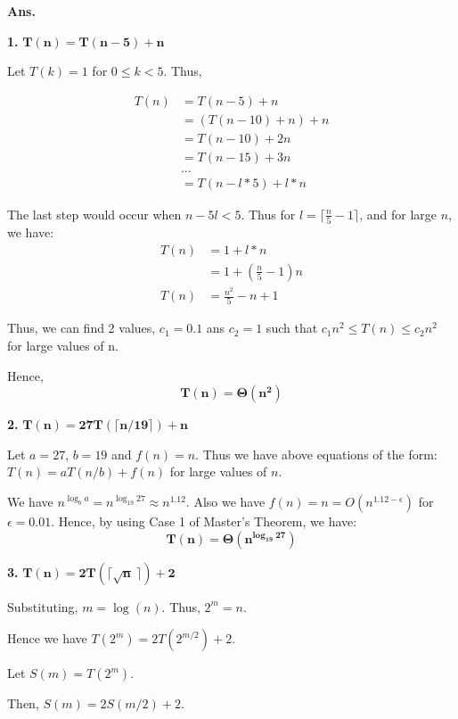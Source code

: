 \documentclass[11pt]{article}
\begin{document}
\noindent \textbf{Ans.}

\textbf{1.} $\mathbf{T(n) = T(n-5) + n}$

Let $T(k) = 1$ for $0 \leq k<5$. Thus,

\begin{equation}
    \begin{split}
        T(n) & = T(n-5) + n\\
        & = (T(n-10)+n)+n\\
        & = T(n-10)+2n\\
        & = T(n-15)+3n\\
        & ...\\
        & = T(n-l*5) + l*n
    \end{split}
\end{equation}

The last step would occur when $n-5l<5$. Thus for $l=\lceil \frac{n}{5} -1 \rceil$, and for large $n$, we have:
\begin{equation}
    \begin{split}
        T(n) & = 1+l*n\\
        &=1+(\frac{n}{5} -1)n\\
        T(n) &= \frac{n^2}{5}-n+1
    \end{split}
\end{equation}

Thus, we can find 2 values, $c_1=0.1$ ans $c_2 = 1$ such that $c_1n^2 \leq T(n) \leq c_2n^2$ for large values of n.

Hence, $$\mathbf{T(n) = \Theta(n^2)}$$ 
\newpage

\textbf{2.} $\mathbf{T(n) = 27T(\lceil n/19 \rceil) + n}$

Let $a = 27$, $b=19$ and $f(n) = n$. Thus we have above equations of the form:
$T(n) = aT(n/b) + f(n)$ for large values of $n$.

We have $n^{\log_b a} = n^{\log_{19} 27} \approx n^{1.12}$. Also we have $f(n) = n = O(n^{1.12-\epsilon})$ for  $\epsilon = 0.01$. Hence, by using Case 1 of Master's Theorem, we have:
    $$\mathbf{T(n) = \Theta(n^{log_{19}\;27})}$$
    
\hfill

\textbf{3.} $\mathbf{T(n) = 2T(\lceil \sqrt{n}\ \rceil ) + 2}$

Substituting, $m = \log(n)$. Thus, $2^m = n$.

Hence we have $T(2^m) = 2T(2^{m/2})+2$.

Let $S(m) = T(2^m)$.

Then, $S(m) = 2S(m/2)+2$.
\end{document}
